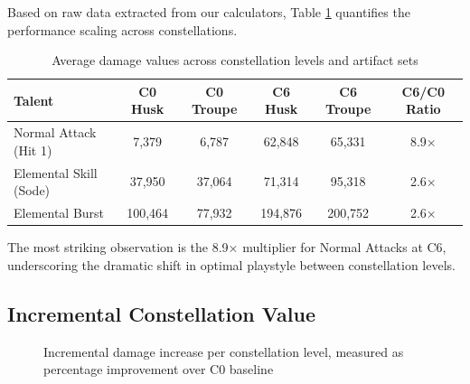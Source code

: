 \documentclass[12pt,a4paper]{article}
\begin{document}
Based on raw data extracted from our calculators, Table \ref{tab:constellation_scaling} quantifies the performance scaling across constellations.

\begin{table}[h]
\centering
\begin{tabular}{lccccc}
\toprule
\textbf{Talent} & \textbf{C0 Husk} & \textbf{C0 Troupe} & \textbf{C6 Husk} & \textbf{C6 Troupe} & \textbf{C6/C0 Ratio} \\
\midrule
Normal Attack (Hit 1) & 7,379 & 6,787 & 62,848 & 65,331 & 8.9× \\
Elemental Skill (Sode) & 37,950 & 37,064 & 71,314 & 95,318 & 2.6× \\
Elemental Burst & 100,464 & 77,932 & 194,876 & 200,752 & 2.6× \\
\bottomrule
\end{tabular}
\caption{Average damage values across constellation levels and artifact sets}
\label{tab:constellation_scaling}
\end{table}

The most striking observation is the 8.9× multiplier for Normal Attacks at C6, underscoring the dramatic shift in optimal playstyle between constellation levels.

\subsection{Incremental Constellation Value}

\begin{figure}[H]
\centering
{}
\caption{Incremental damage increase per constellation level, measured as percentage improvement over C0 baseline}
\label{fig:constellation_value}
\end{figure}
\end{document}
